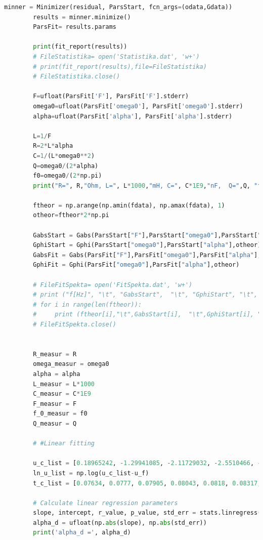 \documentclass[a4paper,11pt]{article}
\begin{document}
\begin{lstlisting}[language=Python, basicstyle=\tiny, breaklines=true]
        minner = Minimizer(residual, ParsStart, fcn_args=(odata,Gdata))
        results = minner.minimize() 
        ParsFit= results.params 
        
        print(fit_report(results))
        # FileStatistika= open('Statistika.dat', 'w+')
        # print(fit_report(results),file=FileStatistika)
        # FileStatistika.close()
        
        F=ufloat(ParsFit['F'], ParsFit['F'].stderr)  
        omega0=ufloat(ParsFit['omega0'], ParsFit['omega0'].stderr)
        alpha=ufloat(ParsFit['alpha'], ParsFit['alpha'].stderr)
        
        L=1/F
        R=2*L*alpha
        C=1/(L*omega0**2)
        Q=omega0/(2*alpha)
        f0=omega0/(2*np.pi)
        print("R=", R,"Ohm, L=", L*1000,"mH, C=", C*1E9,"nF,  Q=",Q, "f0=", f0, "Hz")
        
        ftheor = np.arange(np.amin(fdata), np.amax(fdata), 1)
        otheor=ftheor*2*np.pi
        
        GabsStart = Gabs(ParsStart["F"],ParsStart["omega0"],ParsStart["alpha"],otheor)  
        GphiStart = Gphi(ParsStart["omega0"],ParsStart["alpha"],otheor) 
        GabsFit = Gabs(ParsFit["F"],ParsFit["omega0"],ParsFit["alpha"],otheor)  
        GphiFit = Gphi(ParsFit["omega0"],ParsFit["alpha"],otheor) 
        
        # FileFitSpekta= open('FitSpekta.dat', 'w+')
        # print ("f[Hz]", "\t", "GabsStart",  "\t", "GphiStart", "\t", "GabsFit",  "\t", "GphiFit", file=FileFitSpekta)
        # for i in range(len(ftheor)):
        #     print (ftheor[i],"\t",GabsStart[i],  "\t",GphiStart[i], "\t", GabsFit[i],  "\t",GphiFit[i], file=FileFitSpekta)
        # FileFitSpekta.close()


        R_measur = R
        omega_measur = omega0
        alpha = alpha
        L_measur = L*1000
        C_measur = C*1E9
        F_measur = F
        f_0_measur = f0
        Q_measur = Q

        # #Linear fitting

        u_c_list = [0.18965242, -1.29941085, -2.11729032, -2.5510466, -2.78644109, -2.92356013, -2.98914254]
        ln_u_list = np.log(u_c_list-u_f)
        t_c_list = [0.07634, 0.0777, 0.07905, 0.08043, 0.0818, 0.08317, 0.08452]
        
        # Calculate linear regression parameters
        slope, intercept, r_value, p_value, std_err = stats.linregress(t_c_list, ln_u_list)
        alpha_d = ufloat(np.abs(slope), np.abs(std_err))
        print('alpha_d =', alpha_d)
        

\end{lstlisting}
\end{document}
